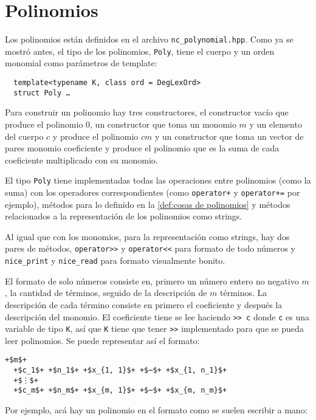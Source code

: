 \documentclass{report}
\theoremstyle{customstyle}
\theoremstyle{factstyle}
\begin{document}
\section{Polinomios}

Los polinomios están definidos en el archivo \texttt{nc\_polynomial.hpp}. Como ya se mostró antes, el tipo de los polinomios, \texttt{Poly}, tiene el cuerpo y un orden monomial como parámetros de template:

\begin{verbatim}
  template<typename K, class ord = DegLexOrd>
  struct Poly …
\end{verbatim}

Para construir un polinomio hay tres constructores, el constructor vacío que produce el polinomio $0$, un constructor que toma un monomio $m$ y un elemento del cuerpo $c$ y produce el polinomio $cm$ y un constructor que toma un vector de pares monomio coeficiente y produce el polinomio que es la suma de cada coeficiente multiplicado con su monomio.

El tipo \texttt{Poly} tiene implementadas todas las operaciones entre polinomios (como la suma) con los operadores correspondientes (como \texttt{operator+} y \texttt{operator+=} por ejemplo), métodos para lo definido en la \cref{def:cosas de polinomios} y métodos relacionados a la representación de los polinomios como strings.

Al igual que con los monomios, para la representación como strings, hay dos pares de métodos, \texttt{operator>>} y \texttt{operator<<} para formato de todo números y \texttt{nice\_print} y \texttt{nice\_read} para formato visualmente bonito.

El formato de solo números consiste en, primero un número entero no negativo $m$, la cantidad de términos, seguido de la descripción de $m$ términos. La descripción de cada término consiste en primero el coeficiente y después la descripción del monomio. El coeficiente tiene se lee haciendo \texttt{>> c} donde \texttt{c} es una variable de tipo \texttt{K}, así que \texttt{K} tiene que tener \texttt{>>} implementado para que se pueda leer polinomios. Se puede representar así el formato:

\begin{lstlisting}[escapechar=+]
  +$m$+
  +$c_1$+ +$n_1$+ +$x_{1, 1}$+ +$⋯$+ +$x_{1, n_1}$+
  +$⋮$+
  +$c_m$+ +$n_m$+ +$x_{m, 1}$+ +$⋯$+ +$x_{m, n_m}$+
\end{lstlisting}

Por ejemplo, acá hay un polinomio en el formato como se suelen escribir a mano:
\end{document}
